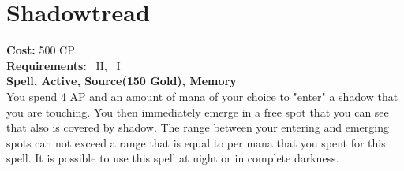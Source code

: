 \section{Shadowtread}\label{spell:shadowtread}
\textbf{Cost:} 500 CP\\
\textbf{Requirements:}~ II,~ I\\
\textbf{Spell, Active, Source(150 Gold), Memory}\\
You spend 4 AP and an amount of mana of your choice to "enter" a shadow that you are touching. 
You then immediately emerge in a free spot that you can see  that also is covered by shadow.
The range between your entering and emerging spots can not exceed a range that is equal to  per mana that you spent for this spell.
It is possible to use this spell at night or in complete darkness.\\